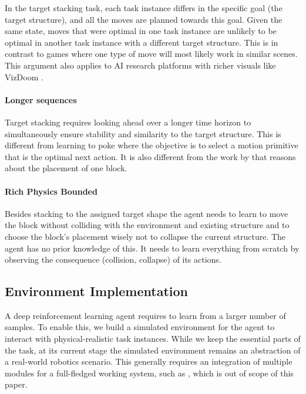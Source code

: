 In the target stacking task, each task instance differs in the specific goal (the target structure), and all the moves are planned towards this goal. Given the same state, moves that were optimal in one task instance are unlikely to be optimal in another task instance with a different target structure. This is in contrast to games where one type of move will most likely work in similar scenes. This argument also applies to AI research platforms with richer visuals like VizDoom \citep{kempka2016vizdoom}.

\paragraph{Longer sequences}
Target stacking requires looking ahead over a longer time horizon to simultaneously ensure stability and similarity to the target structure. This is different from learning to poke \citep{agrawal2016learning} where the objective is to select a motion primitive that is the optimal next action. It is also different from the work by \cite{li2017visual} that reasons about the placement of one block. 

\paragraph{Rich Physics Bounded}
Besides stacking to the assigned target shape the agent needs to learn to move the block without colliding with the environment and existing structure and to choose the block's placement wisely not to collapse the current structure. The agent has no prior knowledge of this. It needs to learn everything from scratch by observing the consequence (collision, collapse) of its actions.  

\subsection{Environment Implementation}
A deep reinforcement learning agent requires to learn from a larger number of samples. To enable this, we build a simulated environment for the agent to interact with physical-realistic task instances. While we keep the essential parts of the task, at its current stage the simulated environment remains an abstraction of a real-world robotics scenario. This generally requires an integration of multiple modules for a full-fledged working system, such as \cite{toussaint2010integrated}, which is out of scope of this paper.


